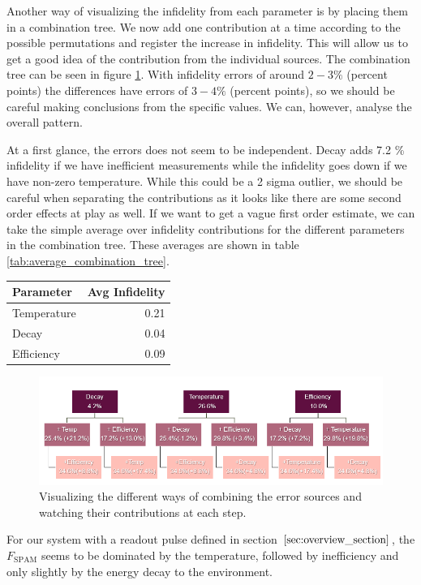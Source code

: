 Another way of visualizing the infidelity from each parameter is by placing them in a combination tree. We now add one contribution at a time according to the possible permutations and register the increase in infidelity. This will allow us to get a good idea of the contribution from the individual sources. The combination tree can be seen in figure \ref{fig:combination_tree_budget}. With infidelity errors of around $2-3\%$ (percent points) the differences have errors of $3-4 \%$ (percent points), so we should be careful making conclusions from the specific values. We can, however, analyse the overall pattern. 

At a first glance, the errors does not seem to be independent. Decay adds 7.2 \% infidelity if we have inefficient measurements while the infidelity goes down if we have non-zero temperature. While this could be a 2 sigma outlier, we should be careful when separating the contributions as it looks like there are some second order effects at play as well. If we want to get a vague first order estimate, we can take the simple average over infidelity contributions for the different parameters in the combination tree. These averages are shown in table \ref{tab:average_combination_tree}. 
\begin{margintable}[-4 cm]
    \centering
    \caption{Average contribution to infidelity when counting in the combination tree seen in figure \ref{fig:combination_tree_budget}}
    \vspace{0.3 cm}
    \begin{tabular}{l|r}
    \hline
    Parameter       &  Avg Infidelity\\ \hline
    Temperature     & 0.21 \\
    Decay           & 0.04 \\
    Efficiency      & 0.09 \\
    \end{tabular}
    \label{tab:average_combination_tree}
\end{margintable}
\begin{figure}
    \centering
    \includegraphics{Figs/Results/combination_tree.png}
    \caption{Visualizing the different ways of combining the error sources and watching their contributions at each step.}
    \label{fig:combination_tree_budget}
\end{figure}
For our system with a readout pulse defined in section $\ref{sec:overview_section}$, the $F_{\text{SPAM}}$ seems to be dominated by the temperature, followed by inefficiency and only slightly by the energy decay to the environment. %





